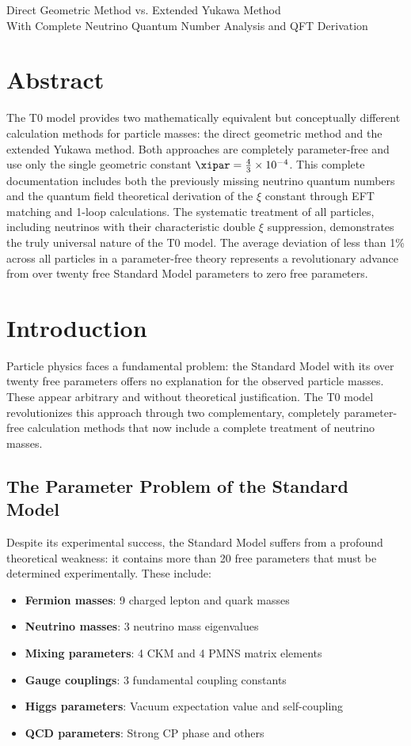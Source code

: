 Direct Geometric Method vs. Extended Yukawa Method \\
	 With Complete Neutrino Quantum Number Analysis and QFT Derivation

\section*{Abstract}
		The T0 model provides two mathematically equivalent but conceptually different calculation methods for particle masses: the direct geometric method and the extended Yukawa method. Both approaches are completely parameter-free and use only the single geometric constant $\xipar = \frac{4}{3} \times 10^{-4}$. This complete documentation includes both the previously missing neutrino quantum numbers and the quantum field theoretical derivation of the $\xi$ constant through EFT matching and 1-loop calculations. The systematic treatment of all particles, including neutrinos with their characteristic double $\xi$ suppression, demonstrates the truly universal nature of the T0 model. The average deviation of less than 1\% across all particles in a parameter-free theory represents a revolutionary advance from over twenty free Standard Model parameters to zero free parameters.

	

	\section{Introduction}
	\label{sec:introduction}
	
	Particle physics faces a fundamental problem: the Standard Model with its over twenty free parameters offers no explanation for the observed particle masses. These appear arbitrary and without theoretical justification. The T0 model revolutionizes this approach through two complementary, completely parameter-free calculation methods that now include a complete treatment of neutrino masses.
	
	\subsection{The Parameter Problem of the Standard Model}
	\label{subsec:parameter_problem}
	
	Despite its experimental success, the Standard Model suffers from a profound theoretical weakness: it contains more than 20 free parameters that must be determined experimentally. These include:
	
	\begin{itemize}
		\item \textbf{Fermion masses}: 9 charged lepton and quark masses
		\item \textbf{Neutrino masses}: 3 neutrino mass eigenvalues
		\item \textbf{Mixing parameters}: 4 CKM and 4 PMNS matrix elements
		\item \textbf{Gauge couplings}: 3 fundamental coupling constants
		\item \textbf{Higgs parameters}: Vacuum expectation value and self-coupling
		\item \textbf{QCD parameters}: Strong CP phase and others
	\end{itemize}
	
